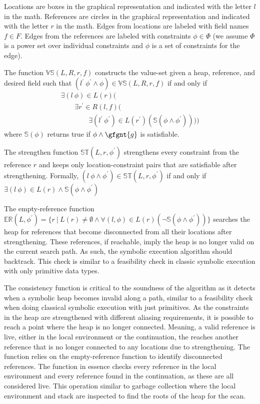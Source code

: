 Locations are boxes in the graphical representation and indicated with
the letter $l$ in the math. References are circles in the graphical
representation and indicated with the letter $r$ in the math. Edges
from locations are labeled with field names $f \in F$. Edges from the
references are labeled with constraints $\phi \in \Phi$ (we assume
$\Phi$ is a power set over individual constraints and $\phi$ is a set
of constraints for the edge).

The function $\mathbb{VS}(L,R,r,f)$ constructs the value-set given a
heap, reference, and desired field such that
$(l^\prime\ \phi^\prime\wedge\phi) \in \mathbb{VS}(L,R,r,f)$ if and
only if
\[
\begin{array}{l}
  \exists (l\ \phi) \in L(r) ( \\
  \ \ \ \ \ \ \ \ \ \exists r^\prime \in R(l,f) ( \\
  \ \ \ \ \ \ \ \ \ \ \ \ \ \ \ \ \ \ \exists (l^\prime\ \phi^\prime) \in L(r^\prime) (\mathbb{S}(\phi\wedge\phi^\prime))))
\end{array}
\]
where $\mathbb{S}(\phi)$ returns true if $\phi \wedge \gfgnt{g}$ is satisfiable.

The strengthen function $\mathbb{ST}(L,r,\phi^\prime)$ strengthens every
constraint from the reference $r$ and keeps only location-constraint
pairs that are satisfiable after strengthening. Formally,
$(l\ \phi\wedge\phi^\prime)\in\mathbb{ST}(L,r,\phi^\prime)$ if and
only if $\exists (l\ \phi)\in
L(r)\wedge\mathbb{S}(\phi\wedge\phi^\prime)$

The empty-reference function $\mathbb{ER}(L,\phi^\prime) = \{r\ |\ L(r) \neq
\emptyset \wedge \forall(l,\phi) \in L(r)(\neg \mathbb{S}(\phi \wedge
\phi^\prime))\}$ searches the heap for references that become
disconnected from all their locations after strengthening. These
references, if reachable, imply the heap is no longer valid on the
current search path. As such, the symbolic execution algorithm should
backtrack. This check is similar to a feasibility check in classic
symbolic execution with only primitive data types.

The consistency function is critical to the soundness of the algorithm
as it detects when a symbolic heap becomes invalid along a path,
similar to a feasibility check when doing classical symbolic execution
with just primitives. As the constraints in the heap are strengthened
with different aliasing requirements, it is possible to reach a point
where the heap is no longer connected. Meaning, a valid reference is
live, either in the local environment or the continuation, the reaches
another reference that is no longer connected to any locations due to
strengthening. The function relies on the empty-reference function to
identify disconnected references. The function in essence checks every
reference in the local environment and every reference found in the
continuation, as these are all considered live. This operation similar
to garbage collection where the local environment and stack are
inspected to find the roots of the heap for the scan.


